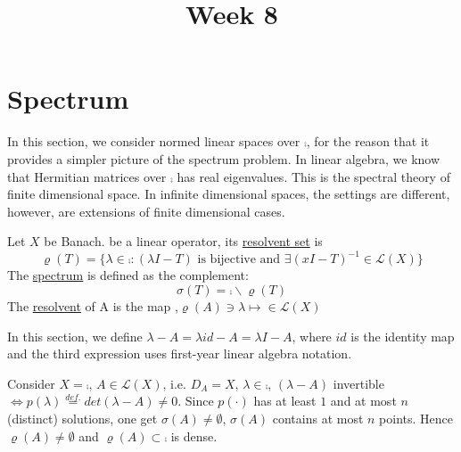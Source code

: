 \documentclass{article}
\title{Week 8}
\begin{document}
\maketitle


\section{Spectrum}
In this section, we consider normed linear spaces over $\comp$, for the reason that it provides a simpler picture of the spectrum problem. In linear algebra, we know that Hermitian matrices over $\comp$ has real eigenvalues. This is the spectral theory of finite dimensional space. In infinite dimensional spaces, the settings are different, however, are extensions of finite dimensional cases.

\begin{definition}\nl
Let $X$ be Banach.  be a linear operator, its {\underline{resolvent set}} is
$$
\varrho({T})=
\{
\lambda\in\comp:(\lambda I-T) \text{ is bijective and } \exists (xI-T)^{-1}\in \mathcal{L}(X)
\}
$$
The {\underline{spectrum}} is defined as the complement:
$$
\sigma(T)=\comp\backslash\varrho(T)
$$
The {\underline{resolvent}} of A is the map ,$\varrho(A)\ni\lambda\mapsto \in\mathcal{L}(X)$
\end{definition}

\begin{remark}\nl
    In this section, we define $\lambda-A=\lambda id -A=\lambda I-A$, where $id$ is the identity map and the third expression uses first-year linear algebra notation.
\end{remark}

\begin{example}
    Consider $X=\comp$, $A\in \mathcal{L}(X)$, i.e. $D_A=X$, $\lambda\in\comp$, $(\lambda-A)$ invertible $\iff p(\lambda)\stackrel{def.}{=}det(\lambda-A)\neq0$. Since  $p(\cdot)$ has at least $1$ and at most $n$ (distinct) solutions, one get $\sigma(A)\neq \emptyset$, $\sigma(A)$ contains at most $n$ points. Hence $\varrho(A)\neq\emptyset$ and $\varrho(A)\subset\comp$ is dense.
\end{example}
\end{document}
